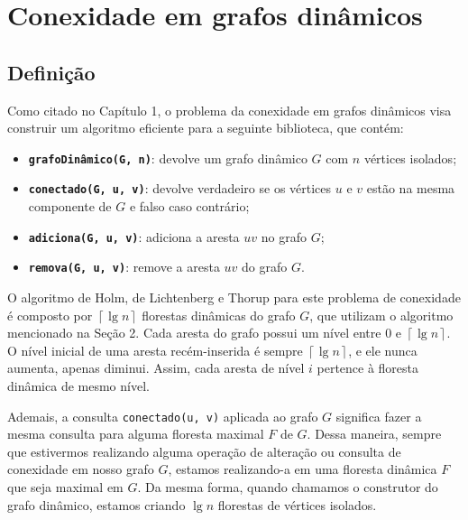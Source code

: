 
\chapter{Conexidade em grafos dinâmicos}

\enlargethispage{.8\baselineskip}

\section{Definição}

Como citado no Capítulo 1, o problema da conexidade em grafos dinâmicos visa construir um algoritmo eficiente para a seguinte biblioteca, que contém:

\begin{itemize}
    \item \texttt{\textbf{grafoDinâmico(G, n)}}: devolve um grafo dinâmico $G$ com $n$ vértices isolados;
    \item \texttt{\textbf{conectado(G, u, v)}}: devolve verdadeiro se os vértices $u$ e $v$ estão na mesma componente de $G$ e falso caso contrário;
    \item \texttt{\textbf{adiciona(G, u, v)}}: adiciona a aresta $uv$ no grafo $G$;
    \item \texttt{\textbf{remova(G, u, v)}}: remove a aresta $uv$ do grafo $G$.
\end{itemize} 

O algoritmo de Holm, de Lichtenberg e Thorup para este problema de conexidade é composto por $\left\lceil \lg n \right\rceil$ florestas dinâmicas do grafo $G$, que utilizam o algoritmo mencionado na Seção 2. Cada aresta do grafo possui um nível entre $0$ e $\left\lceil \lg n \right\rceil$. O nível inicial de uma aresta recém-inserida é sempre $\left\lceil \lg n \right\rceil$, e ele nunca aumenta, apenas diminui. Assim, cada aresta de nível $i$ pertence à floresta dinâmica de mesmo nível. 

Ademais, a consulta \texttt{conectado(u, v)} aplicada ao grafo $G$ significa fazer a mesma consulta para alguma floresta maximal $F$ de $G$. Dessa maneira, sempre que estivermos realizando alguma operação de alteração ou consulta de conexidade em nosso grafo $G$, estamos realizando-a em uma floresta dinâmica $F$ que seja maximal em $G$. Da mesma forma, quando chamamos o construtor do grafo dinâmico, estamos criando $\lg n$ florestas de vértices isolados.